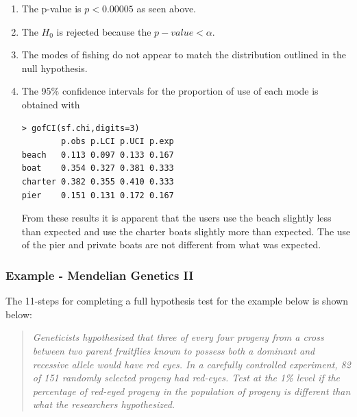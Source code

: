 \documentclass[10pt,openany]{book}\usepackage[]{graphicx}\usepackage[]{color}
\makeatletter
\newenvironment{kframe}{%
 \def\at@end@of@kframe{}%
 \ifinner\ifhmode%
  \def\at@end@of@kframe{\end{minipage}}%
  \begin{minipage}{\columnwidth}%
 \fi\fi%
 \def\FrameCommand##1{\hskip\@totalleftmargin \hskip-\fboxsep
 \colorbox{shadecolor}{##1}\hskip-\fboxsep
     \hskip-\linewidth \hskip-\@totalleftmargin \hskip\columnwidth}%
 \MakeFramed {\advance\hsize-\width
   \@totalleftmargin\z@ \linewidth\hsize
   \@setminipage}}%
 {\par\unskip\endMakeFramed%
 \at@end@of@kframe}
\newenvironment{knitrout}{}{} %
\makeatother
\begin{document}
\begin{enumerate}
  \item The p-value is $p<0.00005$ as seen above.
  \item The $H_{0}$ is rejected because the $p-value<\alpha$.
  \item The modes of fishing do not appear to match the distribution outlined in the null hypothesis.
  \item The 95\% confidence intervals for the proportion of use of each mode is obtained with
\begin{knitrout}
\color{fgcolor}\begin{kframe}
\begin{verbatim}
> gofCI(sf.chi,digits=3)
        p.obs p.LCI p.UCI p.exp
beach   0.113 0.097 0.133 0.167
boat    0.354 0.327 0.381 0.333
charter 0.382 0.355 0.410 0.333
pier    0.151 0.131 0.172 0.167
\end{verbatim}
\end{kframe}
\end{knitrout}
From these results it is apparent that the users use the beach slightly less than expected and use the charter boats slightly more than expected.  The use of the pier and private boats are not different from what was expected.
\end{enumerate}

\subsubsection{Example - Mendelian Genetics II}
The 11-steps  for completing a full hypothesis test for the example below is shown below:

\begin{quote}
\textsl{Geneticists hypothesized that three of every four progeny from a cross between two parent fruitflies known to possess both a dominant and recessive allele would have red eyes.  In a carefully controlled experiment, 82 of 151 randomly selected progeny had red-eyes.  Test at the 1\% level if the percentage of red-eyed progeny in the population of progeny is different than what the researchers hypothesized.}
\end{quote}
\end{document}
